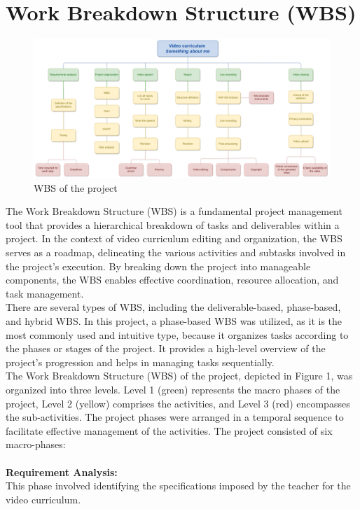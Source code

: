 \documentclass[eng]{class}
\begin{document}
\section{Work Breakdown Structure (WBS)}
\pagestyle{OtherPage}
\begin{figure}[b!]
  \centering
  \includegraphics[width=\textwidth]{images/wbs.png}
  \caption{WBS of the project}
  \label{fig-1}
\end{figure}
The Work Breakdown Structure (WBS) is a fundamental project management tool that provides a hierarchical breakdown of tasks and deliverables within a project.
In the context of video curriculum editing and organization, the WBS serves as a roadmap,
delineating the various activities and subtasks involved in the project's execution.
By breaking down the project into manageable components, the WBS enables effective coordination, resource allocation, and task management.\\
There are several types of WBS, including the deliverable-based, phase-based, and hybrid WBS.
In this project, a phase-based WBS was utilized, as it is the most commonly used and intuitive type, because it organizes tasks according to the  phases or stages of the project.
It provides a high-level overview of the project's progression and helps in managing tasks sequentially.\\
The Work Breakdown Structure (WBS) of the project, depicted in Figure 1, was organized into three levels.
Level 1 (green) represents the macro phases of the project, Level 2 (yellow) comprises the activities, and Level 3 (red) encompasses the sub-activities.
The project phases were arranged in a temporal sequence to facilitate effective management of the activities.
The project consisted of six macro-phases:\\
\\
\textbf{Requirement Analysis:}\\
This phase involved identifying the specifications imposed by the teacher for the video curriculum.
\end{document}
